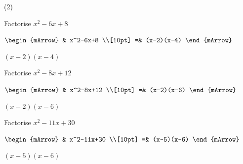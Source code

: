 \begin{mtask}[resume](2)
   \task \begin{exercise} Factorise $x^2-6x+8$\\
             \begin{envSolution}
			      
			      $\begin{mArrow}
			         & x^2-6x+8                    \\[10pt]
                    =& (x-2)(x-4)					 
				 \end{mArrow}$
                 \begin{shortsolution}  
				       $(x-2)(x-4)$
			     \end{shortsolution}				 
               \end{envSolution}
         \end{exercise}

   \task \begin{exercise} Factorise $x^2-8x+12$\\
             \begin{envSolution}
			      
			      $\begin{mArrow}
			         & x^2-8x+12                     \\[10pt]    
					=& (x-2)(x-6)
				 \end{mArrow}$
                 \begin{shortsolution}  
				       $(x-2)(x-6)$
			     \end{shortsolution}				 
               \end{envSolution}
         \end{exercise}

   \task \begin{exercise} Factorise $x^2-11x+30$\\
             \begin{envSolution}
			      
			      $\begin{mArrow}
			         & x^2-11x+30                     \\[10pt]  
                    =& (x-5)(x-6)					 
				 \end{mArrow}$
                 \begin{shortsolution}  
				       $(x-5)(x-6)$
			     \end{shortsolution}				 
               \end{envSolution}
         \end{exercise}


\end{mtask}
